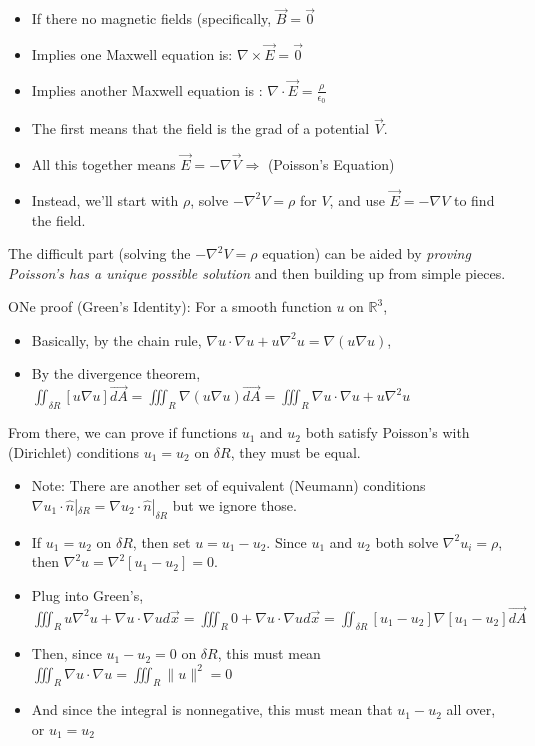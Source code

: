 \documentclass[11pt, oneside]{article}   	%
\begin{document}
\begin{itemize}
\item If there no magnetic fields (specifically, $\vec{B} = \vec{0}$
\item Implies one Maxwell equation is: $\nabla \times \vec{E} = \vec{0}$
\item Implies another Maxwell equation is : $\nabla \cdot \vec{E} = \frac{\rho}{\epsilon_0}$
\item The first means that the field is the grad of a potential $\vec{V}$.
\item All this together means $\vec{E} = -\nabla \vec{V} \Rightarrow$   (Poisson's Equation)
\item Instead, we'll start with $\rho$, solve $-\nabla^2V = \rho$ for $V$, and use $\vec{E} = -\nabla V$ to find the field.
\end{itemize}

 The difficult part (solving the  $-\nabla^2V = \rho$ equation) can be aided by \emph{proving Poisson's has a unique possible solution} and then building up from simple pieces.

ONe proof (Green's Identity): For a smooth function $u$ on $\mathbb{R}^3$, 

\begin{itemize}
\item Basically, by the chain rule, $\nabla u \cdot \nabla u +u \nabla^2 u =  \nabla (u \nabla u)$,
\item By the divergence theorem, $\iint_{\delta R} [u \nabla u] \vec{dA} =  \iiint_{R}  \nabla (u \nabla u) \vec{dA}  = \iiint_R \nabla u \cdot \nabla u +u \nabla^2 u$
\end{itemize}

From there, we can prove if functions $u_1$ and $u_2$ both satisfy Poisson's with (Dirichlet) conditions $u_1 = u_2$ on $\delta R$, they must be equal.
\begin{itemize}
\item Note: There are another set of equivalent (Neumann) conditions $\nabla u_1 \cdot \hat{n}|_{\delta R} = \nabla u_2 \cdot \hat{n}|_{\delta R}$ but we ignore those.
\item If $u_1 = u_2$ on $\delta R$, then set $u = u_1-u_2$. Since $u_1$ and $u_2$ both solve $\nabla^2 u_i = \rho$, then $\nabla^2 u = \nabla^2 [u_1 - u_2] = 0$.
\item Plug into Green's, $\iiint_R u\nabla^2u + \nabla u \cdot \nabla u d\vec{x} = \iiint_R 0 + \nabla u \cdot \nabla u d\vec{x} = \iint_{\delta R} [u_1 - u_2] \nabla [u_1-u_2] \vec{dA}$
\item Then, since $u_1 - u_2 = 0$ on $\delta R$, this must mean $\iiint_R \nabla u \cdot \nabla u = \iiint_R \| u \|^2 = 0$
\item And since the integral is nonnegative, this must mean that $u_1 - u_2$  all over, or $u_1 = u_2$
\end{itemize}
\end{document}
